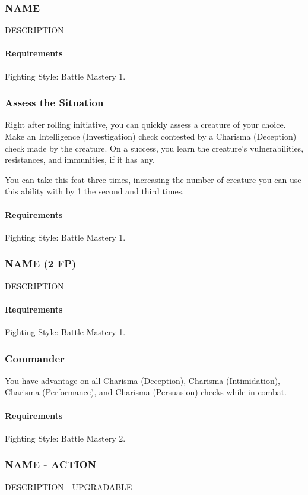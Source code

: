 \subsubsection{NAME} \label{feat::name}
    DESCRIPTION
    \paragraph{Requirements} Fighting Style: Battle Mastery 1.
\subsubsection{Assess the Situation} \label{feat::assessthesituation}
    Right after rolling initiative, you can quickly assess a creature of your choice.
    Make an Intelligence (Investigation) check contested by a Charisma (Deception) check made by the creature.
    On a success, you learn the creature's vulnerabilities, resistances, and immunities, if it has any.

    You can take this feat three times, increasing the number of creature you can use this ability with by 1 the second and third times.
    \paragraph{Requirements} Fighting Style: Battle Mastery 1.
\subsubsection{NAME (2 FP)} \label{feat::name}
    DESCRIPTION
    \paragraph{Requirements} Fighting Style: Battle Mastery 1.
\subsubsection{Commander} \label{feat::commander}
    You have advantage on all Charisma (Deception), Charisma (Intimidation), Charisma (Performance), and Charisma (Persuasion) checks while in combat.
    \paragraph{Requirements} Fighting Style: Battle Mastery 2.
\subsubsection{NAME - ACTION} \label{feat::name}
    DESCRIPTION - UPGRADABLE
